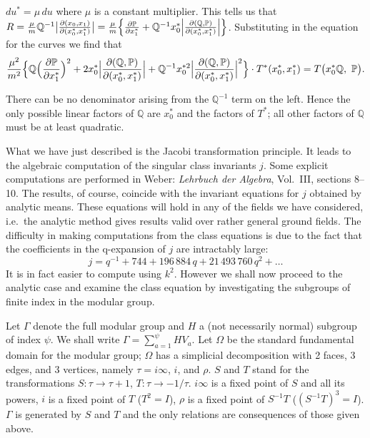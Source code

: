 $du^{*}=\mu\,du$ where $\mu$ is a constant multiplier. This tells us that
$R=\frac{\mu}{m}\mathbb{Q}^{-1}\bigl|\frac{\partial(x_{0},x_{1})}
{\partial(x_{0}^{*},x_{1}^{*})}\bigr|
=\frac{\mu}{m}\Bigl\{\frac{\partial\mathbb{P}}{\partial x_{1}^{*}}
+\mathbb{Q}^{-1}x_{0}^{*}\Bigl|\frac{\partial(\mathbb{Q},\mathbb{P})}
{\partial(x_{0}^{*},x_{1}^{*})}\Bigr|\Bigr\}$. Substituting in the
equation for the curves we find that
\[
\frac{\mu^{2}}{m^{2}}\Bigl\{
\mathbb{Q}\Bigl(\frac{\partial\mathbb{P}}{\partial x_{1}^{*}}\Bigr)^{2}
+2x_{0}^{*}\Bigl|\frac{\partial(\mathbb{Q},\mathbb{P})}
{\partial(x_{0}^{*},x_{1}^{*})}\Bigr|
+\mathbb{Q}^{-1}x_{0}^{*2}
\Bigl|\frac{\partial(\mathbb{Q},\mathbb{P})}
{\partial(x_{0}^{*},x_{1}^{*})}\Bigr|^{2}\Bigr\}\cdot
T^{*}(x_{0}^{*},x_{1}^{*})
=T\bigl(x_{0}^{*}\mathbb{Q},\ \mathbb{P}\bigr).
\]

There can be no denominator arising from the $\mathbb{Q}^{-1}$ term on
the left. Hence the only possible linear factors of $\mathbb{Q}$ are
$x_{0}^{*}$ and the factors of $T^{*}$; all other factors of
$\mathbb{Q}$ must be at least quadratic.

What we have just described is the Jacobi transformation principle. It
leads to the algebraic computation of the singular class invariants $j$.
Some explicit computations are performed in Weber: \emph{Lehrbuch der
Algebra}, Vol.\ III, sections 8--10. The results, of course, coincide
with the invariant equations for $j$ obtained by analytic means. These
equations will hold in any of the fields we have considered, i.e.\ the
analytic method gives results valid over rather general ground fields.
The difficulty in making computations from the class equations is due to
the fact that the coefficients in the q-expansion of $j$ are intractably
large:
\[
j=q^{-1}+744+196\,884\,q+21\,493\,760\,q^{2}+\dots
\]
It is in fact easier to compute using $k^{2}$. However we shall now
proceed to the analytic case and examine the class equation by
investigating the subgroups of finite index in the modular group.

Let $\Gamma$ denote the full modular group and $H$ a (not necessarily
normal) subgroup of index $\psi$. We shall write
$\Gamma=\sum_{a=1}^{\psi}HV_{a}$. Let $\Omega$ be the standard
fundamental domain for the modular group; $\Omega$ has a simplicial
decomposition with 2 faces, 3 edges, and 3 vertices, namely
$\tau=i\infty$, $i$, and $\rho$. $S$ and $T$ stand for the
transformations $S:\tau\longrightarrow\tau+1$, $T:\tau\longrightarrow
-1/\tau$. $i\infty$ is a fixed point of $S$ and all its powers, $i$ is a
fixed point of $T$ ($T^{2}=I$), $\rho$ is a fixed point of $S^{-1}T$
($(S^{-1}T)^{3}=I$). $\Gamma$ is generated by $S$ and $T$ and the only
relations are consequences of those given above.

